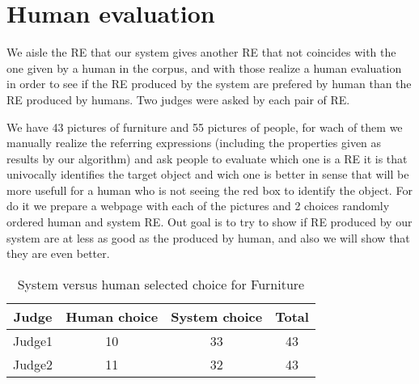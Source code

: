 \section{Human evaluation} \label{sec:evaluation}

We aisle the RE that our system gives another RE that not coincides with the one given by a human in the corpus, and with those realize a human evaluation in order to see if the RE produced by the system are prefered by human than the RE produced by humans. Two judges were asked by each pair of RE.

We have 43 pictures of furniture and 55 pictures of people, for wach of them we manually realize the referring expressions (including the properties given as results by our algorithm) and ask people to evaluate which one is a RE it is that univocally identifies the target object and wich one is better in sense that will be more usefull for a human who is not seeing the red box to identify the object. For do it we prepare a webpage with each of the pictures and 2 choices randomly ordered human and system RE. Out goal is to try to show if RE produced by our system are at less as good as the produced by human, and also we will show that they are even better.



\begin{table}[h!]
\begin{center}
\begin{tabular}{|c|c|c|c|}
\hline
Judge    & Human choice & System choice & Total\\
\hline 
Judge1 & 10       & 33        & 43 \\
Judge2    & 11       & 32        & 43 \\
\hline
\end{tabular}
\caption{System versus human selected choice for Furniture} 
\label{system-versus-human-furniture}
\end{center}
\end{table}


